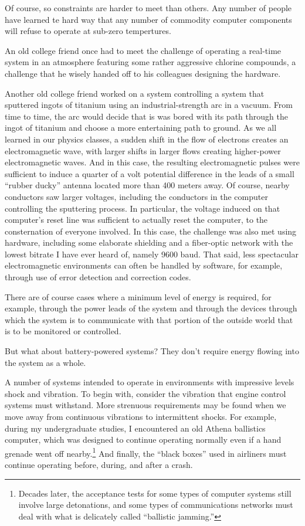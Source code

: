 Of course, so constraints are harder to meet than others.
Any number of people have learned te hard way that any number of
commodity computer components will refuse to operate at sub-zero
tempertures.

An old college friend once had to meet the challenge of operating
a real-time system in an atmosphere featuring some rather aggressive
chlorine compounds, a challenge that he wisely handed off to his
colleagues designing the hardware.

Another old college friend worked on a system controlling a system
that sputtered ingots of titanium using an industrial-strength arc
in a vacuum.
From time to time, the arc would decide that is was bored with its path
through the ingot of titanium and choose a more entertaining path to
ground.
As we all learned in our physics classes, a sudden shift in the flow of
electrons creates an electromagnetic wave, with larger shifts in larger
flows creating higher-power electromagnetic waves.
And in this case, the resulting electromagnetic pulses were sufficient
to induce a quarter of a volt potential difference in the leads of
a small ``rubber ducky'' antenna located more than 400 meters away.
Of course, nearby conductors saw larger voltages, including the conductors
in the computer controlling the sputtering process.
In particular, the voltage induced on that computer's reset line was
sufficient to actually reset the computer, to the consternation of everyone
involved.
In this case, the challenge was also met using hardware, including some
elaborate shielding and a fiber-optic network with the lowest bitrate
I have ever heard of, namely 9600 baud.
That said, less spectacular electromagnetic environments can often be
handled by software, for example, through use of error detection and
correction codes.

There are of course cases where a minimum level of energy
is required, for example, through the power leads of the system and
through the devices through which the system is to communicate with
that portion of the outside world that is to be monitored or controlled.

\QuickQuiz{}
	But what about battery-powered systems?
	They don't require energy flowing into the system as a whole.
 \QuickQuizEnd

A number of systems intended to operate in environments with impressive
levels shock and vibration.
To begin with, consider the vibration that engine control systems
must withstand.
More strenuous requirements may be found when we move away from
continuous vibrations to intermittent shocks.
For example, during my undergraduate studies, I encountered an old Athena
ballistics computer, which was designed to continue operating normally even if
a hand grenade went off nearby.\footnote{
	Decades later, the acceptance tests for some types of computer
	systems still involve large detonations, and some types of
	communications networks must deal with what is delicately
	called ``ballistic jamming.''}
And finally, the ``black boxes'' used in airliners must continue operating
before, during, and after a crash.

